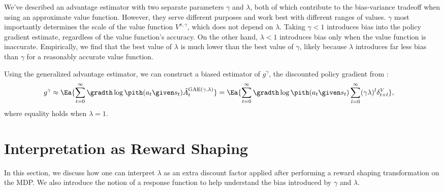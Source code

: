 \documentclass{article}
\renewcommand{\bg}{g}
\newcommand{\dv}{\delta^V}
\newcommand{\hatalam}{\hat{A}^{\mathrm{GAE(\gamma,\lambda)}}}
\newcommand{\delay}{l}
\newcommand{\bgrad}{\bg^{\gamma}}
\newcommand{\Vpigam}{V^{\pi,\gamma}}
\begin{document}
We've described an advantage estimator with two separate parameters $\gamma$ and $\lambda$, both of which contribute to the bias-variance tradeoff when using an approximate value function.
However, they serve different purposes and work best with different ranges of values.
$\gamma$ most importantly determines the scale of the value function $\Vpigam$, which does not depend on $\lambda$.
Taking $\gamma < 1$ introduces bias into the policy gradient estimate, regardless of the value function's accuracy.
On the other hand, $\lambda < 1$ introduces bias only when the value function is inaccurate.
Empirically, we find that the best value of $\lambda$ is much lower than the best value of $\gamma$, likely because $\lambda$ introduces far less bias than $\gamma$ for a reasonably accurate value function.

Using the generalized advantage estimator, we can construct a biased estimator of $\bgrad$, the discounted policy gradient from :
\begin{align}
\bgrad &\approx \Ea{\sum_{t=0}^{\infty} \gradth \log \pith(a_t \given s_t) \hatalam_t}
= \Ea{\sum_{t=0}^{\infty} \gradth \log \pith(a_t \given s_t) \sum_{\delay=0}^{\infty} (\gamma \lambda)^{\delay}\dv_{t+\delay}},
\label{eq:pg-gae1}
\end{align}
where equality holds when $\lambda=1$.



\section{Interpretation as Reward Shaping}
\label{sec:shaping}

In this section, we discuss how one can interpret $\lambda$ as an extra discount factor applied after performing a reward shaping transformation on the MDP.
We also introduce the notion of a response function to help understand the bias introduced by $\gamma$ and $\lambda$.
\end{document}
